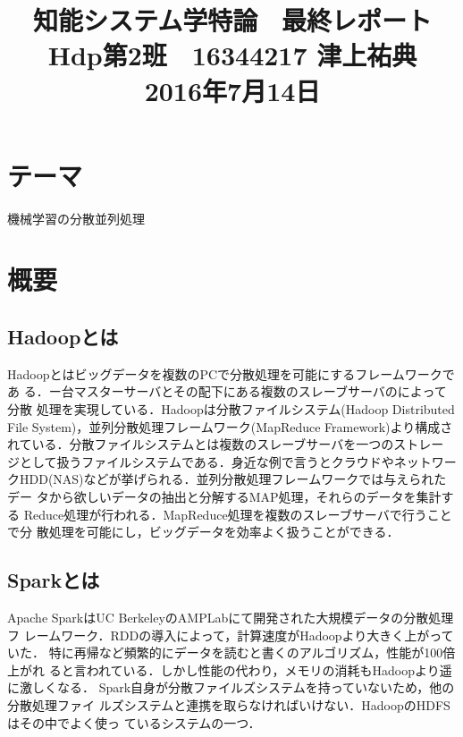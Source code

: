 \documentclass[a4paper,12pt]{jarticle}
\begin{document}
%
\title{\vspace{-30mm}知能システム学特論 \ 最終レポート\\ Hdp第2班　16344217 津上祐典\\ 2016年7月14日}
\date{}
%
%
\maketitle
%
\vspace{-30mm}
%
 \section{テーマ}
機械学習の分散並列処理
\section{概要}

\subsection{Hadoopとは}
Hadoopとはビッグデータを複数のPCで分散処理を可能にするフレームワークであ
る．ー台マスターサーバとその配下にある複数のスレーブサーバのによって分散
処理を実現している．Hadoopは分散ファイルシステム(Hadoop Distributed File
System)，並列分散処理フレームワーク(MapReduce
Framework)より構成されている．分散ファイルシステムとは複数のスレーブサーバを一つのストレー
ジとして扱うファイルシステムである．身近な例で言うとクラウドやネットワー
クHDD(NAS)などが挙げられる．並列分散処理フレームワークでは与えられたデー
タから欲しいデータの抽出と分解するMAP処理，それらのデータを集計する
Reduce処理が行われる．MapReduce処理を複数のスレーブサーバで行うことで分
散処理を可能にし，ビッグデータを効率よく扱うことができる．

\subsection{Sparkとは}
Apache SparkはUC BerkeleyのAMPLabにて開発された大規模データの分散処理フ
レームワーク．RDDの導入によって，計算速度がHadoopより大きく上がっていた．
特に再帰など頻繁的にデータを読むと書くのアルゴリズム，性能が100倍上がれ
ると言われている．しかし性能の代わり，メモリの消耗もHadoopより遥に激しくなる．
Spark自身が分散ファイルズシステムを持っていないため，他の分散処理ファイ
ルズシステムと連携を取らなければいけない．HadoopのHDFSはその中でよく使っ
ているシステムの一つ．
\end{document}
